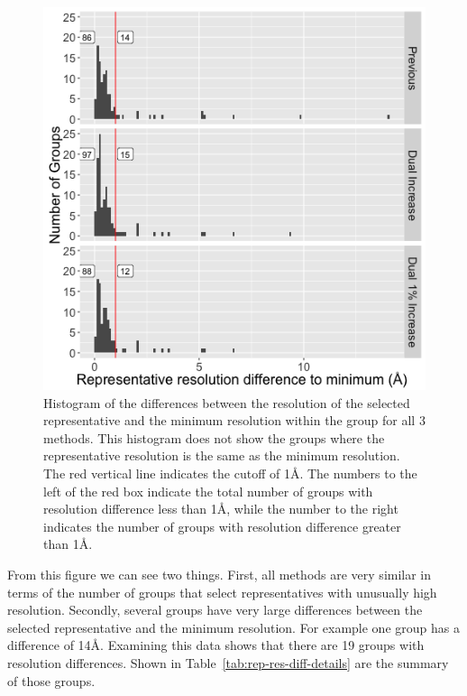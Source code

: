 \begin{figure}
  \includegraphics[width=0.5\linewidth]{chapter-4/figs/res-diff}
  \caption{Histogram of the differences between the resolution of the selected
    representative and the minimum resolution within the group for all 3
    methods. This histogram does not show the groups where the representative
    resolution is the same as the minimum resolution.  The red vertical line
    indicates the cutoff of 1{\AA}. The numbers to the left of the red box indicate
    the total number of groups with resolution difference less than 1{\AA}, while
    the number to the right indicates the number of groups with resolution
  difference greater than 1{\AA}.}
  \label{fig:res-diff-histogram}
\end{figure}

From this figure we can see two things. First, all methods are very similar in
terms of the number of groups that select representatives with unusually high
resolution. Secondly, several groups have very large differences between the
selected representative and the minimum resolution. For example one group has a
difference of 14\AA. Examining this data shows that there are 19 groups with
resolution differences. Shown in Table~\ref{tab:rep-res-diff-details} are the
summary of those groups.


